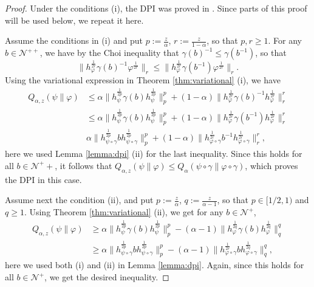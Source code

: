 \documentclass[12pt]{article}
\theoremstyle{definition}
\theoremstyle{remark}
\numberwithin{equation}{section}
\def\Ne{\mathcal N}
\begin{document}
\begin{proof} Under the conditions (i), the DPI was proved in \cite[Theorem 1
(viii)]{kato2023onrenyi}.
Since parts of this proof will be used below, we repeat it here.

 Assume the conditions in (i) and put $p:=\frac{z}{\alpha}$, $r:=\frac{z}{1-\alpha}$, so
 that  $p,r\ge 1$. 
For any   $b\in \Ne^{++}$, we have by  the Choi inequality \cite{choi1974aschwarz} 
that  $\gamma(b)^{-1}\le \gamma(b^{-1})$, so that  
\[
\|h_\varphi^{\frac{1}{2r}}\gamma(b)^{-1}\varphi^{\frac{1}{2r}}\|_r\le
\|h_\varphi^{\frac{1}{2r}}\gamma(b^{-1})\varphi^{\frac{1}{2r}}\|_r.
\]
Using the variational expression in Theorem \ref{thm:variational} (i), we have
\begin{align}\label{eq:dpif}
Q_{\alpha,z}(\psi\|\varphi)&\le \alpha\|h_\psi^{\frac{1}{2p}}\gamma(b)h_\psi^{\frac{1}{2p}}\|_p^p+
(1-\alpha)\|h_\varphi^{\frac{1}{2r}}\gamma(b)^{-1}h_\varphi^{\frac{1}{2r}}\|_r^r\\
&\le  \alpha\|h_\psi^{\frac{1}{2p}}\gamma(b)h_\psi^{\frac{1}{2p}}\|_p^p+
(1-\alpha)\|h_\varphi^{\frac{1}{2r}}\gamma(b^{-1})h_\varphi^{\frac{1}{2r}}\|_r^r\\
&  \alpha\|h_{\psi\circ\gamma}^{\frac{1}{2p}}bh_{\psi\circ\gamma}^{\frac{1}{2p}}\|_p^p+
(1-\alpha)\|h_{\varphi\circ\gamma}^{\frac{1}{2r}}b^{-1}h_{\varphi\circ\gamma}^{\frac{1}{2r}}\|_r^r,\label{eq:dpil}
\end{align}
here we used Lemma \ref{lemma:dpi} (ii) for the last inequality. Since this holds for all
$b\in \Ne^++$, it follows that $Q_{\alpha,z}(\psi\|\varphi)\le
Q_{\alpha}(\psi\circ\gamma\|\varphi\circ\gamma)$, which proves the DPI in this case.


Assume next the condition (ii), and put $p:=\frac{z}{\alpha}$, $q:=\frac{z}{\alpha-1}$, so
that $p\in [1/2,1)$ and $q\ge 1$. Using Theorem
\ref{thm:variational} (ii), we get for any $b\in \Ne^+$,
\begin{align*}
Q_{\alpha,z}(\psi\|\varphi)&\ge
\alpha\|h_\psi^{\frac{1}{2p}}\gamma(b)h_\psi^{\frac{1}{2p}}\|_p^p-
(\alpha-1)\|h_\varphi^{\frac{1}{2q}}\gamma(b)h_\varphi^{\frac{1}{2q}}\|_q^q\\
&\ge \alpha\|h_{\psi\circ\gamma}^{\frac{1}{2p}}bh_{\psi\circ\gamma}^{\frac{1}{2p}}\|_p^p-
(\alpha-1)\|h_{\varphi\circ\gamma}^{\frac{1}{2r}}bh_{\varphi\circ\gamma}^{\frac{1}{2q}}\|_q^q,
\end{align*}
here we used both (i) and (ii) in Lemma \ref{lemma:dpi}. Again, since this holds for all
$b\in \Ne^+$, we get the desired inequality.



\end{proof}
\end{document}
